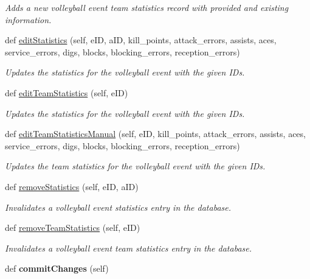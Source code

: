 \begin{DoxyCompactItemize}
\begin{DoxyCompactList}\small\item\em Adds a new volleyball event team statistics record with provided and existing information. \end{DoxyCompactList}\item 
def \hyperlink{classhandler_1_1dao_1_1volleyball__event__dao_1_1_volleyball_event_d_a_o_a8aac4d289e02c18f44c0780b5fdb5941}{edit\+Statistics} (self, e\+ID, a\+ID, kill\+\_\+points, attack\+\_\+errors, assists, aces, service\+\_\+errors, digs, blocks, blocking\+\_\+errors, reception\+\_\+errors)
\begin{DoxyCompactList}\small\item\em Updates the statistics for the volleyball event with the given I\+Ds. \end{DoxyCompactList}\item 
def \hyperlink{classhandler_1_1dao_1_1volleyball__event__dao_1_1_volleyball_event_d_a_o_ab6748767a12639d8eb5aa014ccb5ad81}{edit\+Team\+Statistics} (self, e\+ID)
\begin{DoxyCompactList}\small\item\em Updates the statistics for the volleyball event with the given I\+Ds. \end{DoxyCompactList}\item 
def \hyperlink{classhandler_1_1dao_1_1volleyball__event__dao_1_1_volleyball_event_d_a_o_af01eb5df6258e5f21a446a7460a8f575}{edit\+Team\+Statistics\+Manual} (self, e\+ID, kill\+\_\+points, attack\+\_\+errors, assists, aces, service\+\_\+errors, digs, blocks, blocking\+\_\+errors, reception\+\_\+errors)
\begin{DoxyCompactList}\small\item\em Updates the team statistics for the volleyball event with the given I\+Ds. \end{DoxyCompactList}\item 
def \hyperlink{classhandler_1_1dao_1_1volleyball__event__dao_1_1_volleyball_event_d_a_o_a089bd6d6f2c2cb4bb1c7030d84859043}{remove\+Statistics} (self, e\+ID, a\+ID)
\begin{DoxyCompactList}\small\item\em Invalidates a volleyball event statistics entry in the database. \end{DoxyCompactList}\item 
def \hyperlink{classhandler_1_1dao_1_1volleyball__event__dao_1_1_volleyball_event_d_a_o_a6a4b8d0782afa791f574c068bdbe1177}{remove\+Team\+Statistics} (self, e\+ID)
\begin{DoxyCompactList}\small\item\em Invalidates a volleyball event team statistics entry in the database. \end{DoxyCompactList}\item 
\mbox{\label{classhandler_1_1dao_1_1volleyball__event__dao_1_1_volleyball_event_d_a_o_a3aad47d91ad279f8b4e0f0c008e68b5a}} 
def {\bfseries commit\+Changes} (self)
\end{DoxyCompactItemize}
